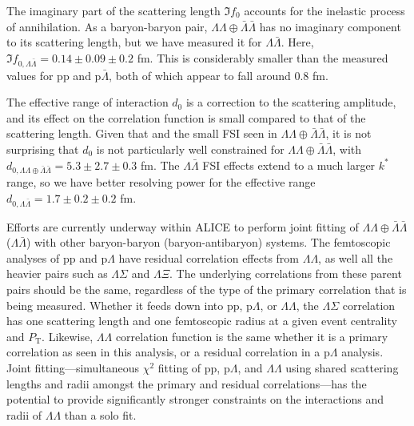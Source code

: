 The imaginary part of the scattering length $\Im f_0$ accounts for the inelastic process of annihilation.
As a baryon-baryon pair, $\Lambda\Lambda\oplus\bar{\Lambda}\bar{\Lambda}$ has no imaginary component to its scattering length, but we have measured it for $\Lambda\bar{\Lambda}$.
Here, $\Im f_{0,\Lambda\bar{\Lambda}} = 0.14 \pm 0.09 \pm 0.2$ fm.
This is considerably smaller than the measured values for p$\mathrm{p}$ and p$\bar{\Lambda}$, both of which appear to fall around 0.8 fm.

The effective range of interaction $d_0$ is a correction to the scattering amplitude, and its effect on the correlation function is small compared to that of the scattering length.
Given that and the small FSI seen in $\Lambda\Lambda\oplus\bar{\Lambda}\bar{\Lambda}$, it is not surprising that $d_0$ is not particularly well constrained for $\Lambda\Lambda\oplus\bar{\Lambda}\bar{\Lambda}$, with $d_{0,\Lambda\Lambda\oplus\bar{\Lambda}\bar{\Lambda}} = 5.3 \pm 2.7 \pm 0.3$ fm.
The $\Lambda\bar{\Lambda}$ FSI effects extend to a much larger $k^*$ range, so we have better resolving power for the effective range $d_{0,\Lambda\bar{\Lambda}} = 1.7 \pm 0.2 \pm 0.2$ fm.

Efforts are currently underway within ALICE to perform joint fitting of $\Lambda\Lambda\oplus\bar{\Lambda}\bar{\Lambda}$ ($\Lambda\bar{\Lambda}$) with other baryon-baryon (baryon-antibaryon) systems.
The femtoscopic analyses of pp and p$\Lambda$ have residual correlation effects from $\Lambda\Lambda$, as well all the heavier pairs such as $\Lambda\Sigma$ and $\Lambda\Xi$.
The underlying correlations from these parent pairs should be the same, regardless of the type of the primary correlation that is being measured.
Whether it feeds down into pp, p$\Lambda$, or $\Lambda\Lambda$, the $\Lambda\Sigma$ correlation has one scattering length and one femtoscopic radius at a given event centrality and $P_\mathrm{T}$.
Likewise, $\Lambda\Lambda$ correlation function is the same whether it is a primary correlation as seen in this analysis, or a residual correlation in a p$\Lambda$ analysis.
Joint fitting---simultaneous $\chi^2$ fitting of pp, p$\Lambda$, and $\Lambda\Lambda$ using shared scattering lengths and radii amongst the primary and residual correlations---has the potential to provide significantly stronger constraints on the interactions and radii of $\Lambda\Lambda$ than a solo fit.

